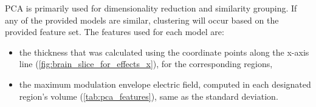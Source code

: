 \gls{PCA} is primarily used for dimensionality reduction and similarity grouping. If any of the provided models are similar, clustering will occur based on the provided feature set. The features used for each model are:
\begin{itemize}
    \item the thickness that was calculated using the coordinate points along the x-axis line (\autoref{fig:brain_slice_for_effects_x}), for the corresponding regions,
    \item the maximum modulation envelope electric field, computed in each designated region's volume (\autoref{tab:pca_features}), same as the standard deviation.
\end{itemize}
